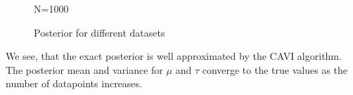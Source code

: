 \documentclass{article}
\begin{document}
\begin{multicols}{2}
\begin{figure}[H]
\begin{minipage}{0.49\textwidth}
            \caption{N=1000}
        \end{minipage}
        \caption{Posterior for different datasets}\label{fig:posterior}
    \end{figure}

    We see, that the exact posterior is well approximated by the CAVI algorithm. The posterior mean and variance for $\mu$ and $\tau$ converge to the true values as the number of datapoints increases.

    

\end{multicols}
\clearpage
{}
\printbibliography{}
\end{document}
